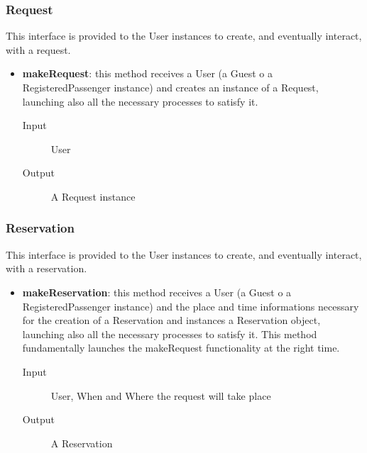 		\subsubsection{Request}
		This interface is provided to the User instances to create, and eventually interact, with a request.
		\begin{itemize}
			\item \textbf{makeRequest}: this method receives a User (a Guest o a RegisteredPassenger instance)
			and creates	an instance of a Request, launching also all the necessary processes to satisfy it.
			\begin{description}
				\item[Input] User
				\item[Output] A Request instance
			\end{description}
		\end{itemize}
		\subsubsection{Reservation}
		This interface is provided to the User instances to create, and eventually interact, with a reservation.
		\begin{itemize}
			\item \textbf{makeReservation}: this method receives a User (a Guest o a RegisteredPassenger instance)
			and the place and time informations necessary for the creation of a Reservation and instances a
			Reservation object, launching also all the necessary processes to satisfy it. This method fundamentally
			launches the makeRequest functionality at the right time.
			\begin{description}
				\item[Input] User, When and Where the request will take place
				\item[Output] A Reservation
			\end{description}
		\end{itemize}
